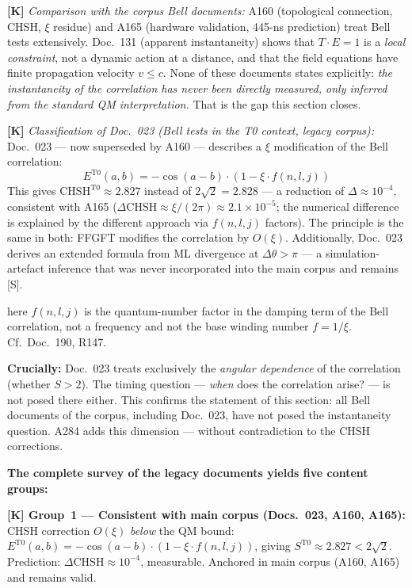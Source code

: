 \textbf{[K]} \emph{Comparison with the corpus Bell documents:}
A160 (topological connection, CHSH, $\xi$ residue) and A165 (hardware validation, 445-ns prediction) treat Bell tests extensively. Doc.~131 (apparent instantaneity) shows that $T \cdot E = 1$ is a \emph{local constraint}, not a dynamic action at a distance, and that the field equations have finite propagation velocity $v \le c$. None of these documents states explicitly: \emph{the instantaneity of the correlation has never been directly measured, only inferred from the standard QM interpretation.} That is the gap this section closes.

\textbf{[K]} \emph{Classification of Doc.~023 (Bell tests in the T0 context, legacy corpus):}
Doc.~023 --- now superseded by A160 --- describes a $\xi$ modification of the Bell correlation:
\[
  E^{\mathrm{T0}}(a,b) = -\cos(a-b)\cdot(1-\xi\cdot f(n,l,j))
\]
This gives $\mathrm{CHSH}^{\mathrm{T0}} \approx 2{.}827$ instead of $2\sqrt{2} = 2{.}828$ --- a reduction of $\Delta \approx 10^{-4}$, consistent with A165 ($\Delta\mathrm{CHSH} \approx \xi/(2\pi) \approx 2{.}1\times10^{-5}$; the numerical difference is explained by the different approach via $f(n,l,j)$ factors). The principle is the same in both: FFGFT modifies the correlation by $O(\xi)$. Additionally, Doc.~023 derives an extended formula from ML divergence at $\Delta\theta > \pi$ --- a simulation-artefact inference that was never incorporated into the main corpus and remains [S].

here $f(n,l,j)$ is the quantum-number factor in the damping term of the Bell correlation, not a frequency and not the base winding number $f = 1/\xi$. Cf.\ Doc.~190, R147.

\textbf{Crucially:} Doc.~023 treats exclusively the \emph{angular dependence} of the correlation (whether $S > 2$). The timing question --- \emph{when} does the correlation arise? --- is not posed there either. This confirms the statement of this section: all Bell documents of the corpus, including Doc.~023, have not posed the instantaneity question. A284 adds this dimension --- without contradiction to the CHSH corrections.

\textbf{The complete survey of the legacy documents yields five content groups:}

\textbf{[K] Group~1 --- Consistent with main corpus (Docs.~023, A160, A165):}
CHSH correction $O(\xi)$ \emph{below} the QM bound:
$E^{\mathrm{T0}}(a,b) = -\cos(a-b)\cdot(1-\xi\cdot f(n,l,j))$,
giving $S^{\mathrm{T0}} \approx 2{.}827 < 2\sqrt{2}$.
Prediction: $\Delta\mathrm{CHSH} \approx 10^{-4}$, measurable.
Anchored in main corpus (A160, A165) and remains valid.

